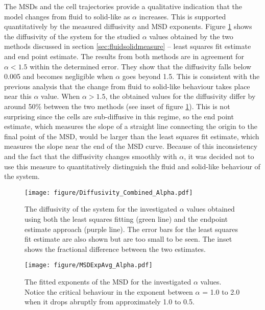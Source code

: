 \documentclass[a4paper,12pt]{article}
\begin{document}
The MSDs and the cell trajectories provide a qualitative indication that the model changes from fluid to solid-like as $\alpha$ increases. This is supported quantitatively by the measured diffusivity and MSD exponents. Figure \ref{fig:diffalpha} shows the diffusivity of the system for the studied $\alpha$ values obtained by the two methods discussed in section \ref{sec:fluidsolidmeasure} – least squares fit estimate and end point estimate. The results from both methods are in agreement for $\alpha < 1.5$ within the determined error. They show that the diffusivity falls below 0.005 and becomes negligible when $\alpha$ goes beyond 1.5. This is consistent with the previous analysis that the change from fluid to solid-like behaviour takes place near this $\alpha$ value. When $\alpha > 1.5$, the obtained values for the diffusivity differ by around 50\% between the two methods (see inset of figure \ref{fig:diffalpha}). This is not surprising since the cells are sub-diffusive in this regime, so the end point estimate, which measures the slope of a straight line connecting the origin to the final point of the MSD, would be larger than the least squares fit estimate, which measures the slope near the end of the MSD curve. Because of this inconsistency and the fact that the diffusivity changes smoothly with $\alpha$, it was decided not to use this measure to quantitatively distinguish the fluid and solid-like behaviour of the system.
\begin{figure}[h]
\centering
\texttt{[image: figure/Diffusivity\_Combined\_Alpha.pdf]}
\caption{The diffusivity of the system for the investigated $\alpha$ values obtained using both the least squares fitting (green line) and the endpoint estimate approach (purple line). The error bars for the least squares fit estimate are also shown but are too small to be seen. The inset shows the fractional difference between the two estimates.}
\label{fig:diffalpha}
\end{figure}


\begin{figure}[h]
\centering
\texttt{[image: figure/MSDExpAvg\_Alpha.pdf]}
\caption{The fitted exponents of the MSD for the investigated $\alpha$ values. Notice the critical behaviour in the exponent between $\alpha$ = 1.0 to 2.0 when it drops abruptly from approximately 1.0 to 0.5.}
\label{fig:diffexpalpha}
\end{figure}
\end{document}
